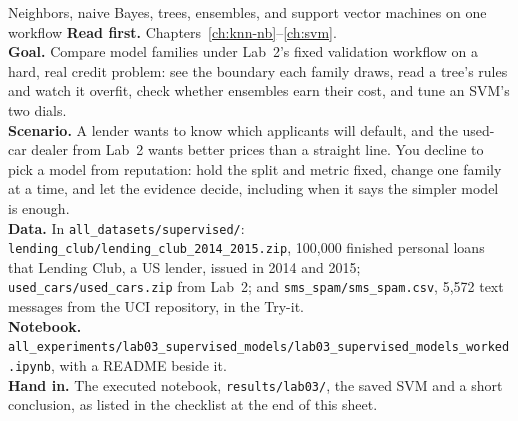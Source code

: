 
\begin{labproject}{Neighbors, naive Bayes, trees, ensembles, and support vector machines on one workflow}
\textbf{Read first.} Chapters~\ref{ch:knn-nb}--\ref{ch:svm}.\\
\textbf{Goal.} Compare model families under Lab~2's fixed validation workflow on a hard, real credit problem: see the boundary each family draws, read a tree's rules and watch it overfit, check whether ensembles earn their cost, and tune an SVM's two dials.\\
\textbf{Scenario.} A lender wants to know which applicants will default, and the used-car dealer from Lab~2 wants better prices than a straight line. You decline to pick a model from reputation: hold the split and metric fixed, change one family at a time, and let the evidence decide, including when it says the simpler model is enough.\\
\textbf{Data.} In \texttt{all\_datasets/\allowbreak supervised/}: \texttt{lending\_club/\allowbreak lending\_club\_2014\_2015.zip}, 100,000 finished personal loans that Lending Club, a US lender, issued in 2014 and 2015; \texttt{used\_cars/\allowbreak used\_cars.zip} from Lab~2; and \texttt{sms\_spam/\allowbreak sms\_spam.csv}, 5,572 text messages from the UCI repository, in the Try-it.\\
\textbf{Notebook.} \texttt{all\_experiments/\allowbreak lab03\_supervised\_models/\allowbreak lab03\_supervised\_models\_worked.ipynb}, with a README beside it.\\
\textbf{Hand in.} The executed notebook, \texttt{results/lab03/}, the saved SVM and a short conclusion, as listed in the checklist at the end of this sheet.
\end{labproject}


